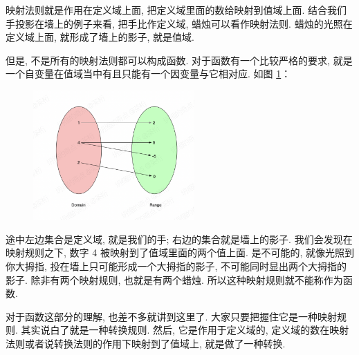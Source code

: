 映射法则就是作用在定义域上面, 把定义域里面的数给映射到值域上面. 结合我们手投影在墙上的例子来看, 把手比作定义域, 蜡烛可以看作映射法则. 蜡烛的光照在定义域上面, 就形成了墙上的影子, 就是值域. 

但是, 不是所有的映射法则都可以构成函数. 对于函数有一个比较严格的要求, 就是一个自变量在值域当中有且只能有一个因变量与它相对应. 如图 \ref{fig:img7_3}：

\begin{figure}[ht]
  \centering
  \includegraphics[width=0.55\textwidth]{asset/78b109d0-c39f-446b-ba0a-2b983138d76f.png}
  \caption{}
  \label{fig:img7_3}
\end{figure}

途中左边集合是定义域, 就是我们的手; 右边的集合就是墙上的影子. 我们会发现在映射规则之下, 数字 4 被映射到了值域里面的两个值上面. 是不可能的, 就像光照到你大拇指, 投在墙上只可能形成一个大拇指的影子, 不可能同时显出两个大拇指的影子. 除非有两个映射规则, 也就是有两个蜡烛. 所以这种映射规则就不能称作为函数. 

对于函数这部分的理解, 也差不多就讲到这里了. 大家只要把握住它是一种映射规则. 其实说白了就是一种转换规则. 然后, 它是作用于定义域的, 定义域的数在映射法则或者说转换法则的作用下映射到了值域上, 就是做了一种转换. 
